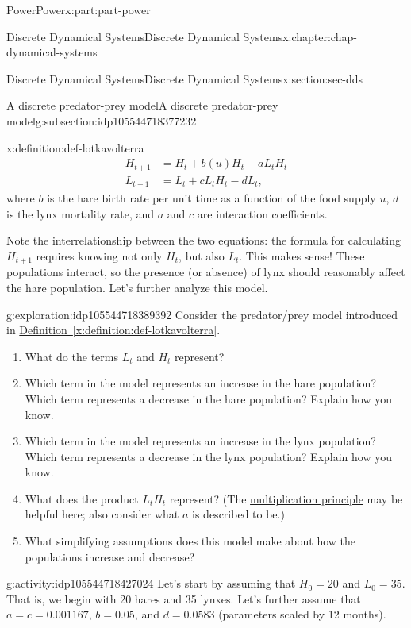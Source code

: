 \documentclass[oneside,10pt,]{book}
\newcommand{\xreffont}{\relax}
\numberwithin{equation}{section}
\newcommand{\amp}{&}
\begin{document}
\begin{partptx}{Power}{}{Power}{}{}{x:part:part-power}
\begin{chapterptx}{Discrete Dynamical Systems}{}{Discrete Dynamical Systems}{}{}{x:chapter:chap-dynamical-systems}
\begin{sectionptx}{Discrete Dynamical Systems}{}{Discrete Dynamical Systems}{}{}{x:section:sec-dds}
\begin{subsectionptx}{A discrete predator-prey model}{}{A discrete predator-prey model}{}{}{g:subsection:idp105544718377232}
\begin{definition}{}{x:definition:def-lotkavolterra}
\begin{align*}
H_{t+1} \amp = H_t + b(u) H_t - a L_t H_t\\
L_{t+1} \amp = L_t + c L_t H_t - d L_t,
\end{align*}
where \(b\) is the hare birth rate per unit time as a function of the food supply \(u\), \(d\) is the lynx mortality rate, and \(a\) and \(c\) are interaction coefficients.%
\end{definition}
Note the interrelationship between the two equations: the formula for calculating \(H_{t+1}\) requires knowing not only \(H_t\), but also \(L_t\). This makes sense! These populations interact, so the presence (or absence) of lynx should reasonably affect the hare population. Let's further analyze this model.%
\begin{exploration}{}{g:exploration:idp105544718389392}%
Consider the predator\slash{}prey model introduced in \hyperref[x:definition:def-lotkavolterra]{Definition~{\xreffont\ref{x:definition:def-lotkavolterra}}}.%
%
\begin{enumerate}
\item{}What do the terms \(L_t\) and \(H_t\) represent?%
\item{}Which term in the model represents an increase in the hare population? Which term represents a decrease in the hare population? Explain how you know.%
\item{}Which term in the model represents an increase in the lynx population? Which term represents a decrease in the lynx population? Explain how you know.%
\item{}What does the product \(L_t H_t\) represent? (The \href{https://en.wikipedia.org/wiki/Rule_of_product}{multiplication principle}\footnotemark{} may be helpful here; also consider what \(a\) is described to be.)%
\item{}What simplifying assumptions does this model make about how the populations increase and decrease?%
\end{enumerate}
\end{exploration}%
%
\begin{activity}{}{g:activity:idp105544718427024}%
Let's start by assuming that \(H_0 = 20\) and \(L_0 = 35\). That is, we begin with 20 hares and 35 lynxes. Let's further assume that \(a = c = 0.001167\), \(b = 0.05\), and \(d = 0.0583\) (parameters scaled by 12 months).%
%
\begin{enumerate}

\end{enumerate}
\end{activity}
\end{subsectionptx}
\end{sectionptx}
\end{chapterptx}
\end{partptx}
\end{document}
